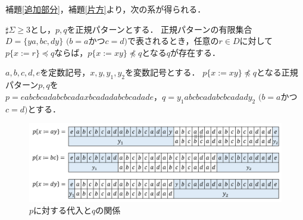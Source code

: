 補題\ref{追加部分}，補題\ref{片方}より，次の系が得られる．

\begin{col}\label{両方}
$\sharp \Sigma \ge 3$とし，$p, q$を正規パターンとする．
正規パターンの有限集合$D= \{ ya, bc, dy \}$ $(b = a$かつ$c = d)$で表されるとき，任意の$r \in D$に対して$p \{ x := r \} \preceq q$ならば，$p \{ x := xy \} \not \preceq q$となる$q$が存在する．
\end{col}
\begin{ex}
$a,b,c,d,e$を定数記号，$x,y,y_{1},y_{2}$を変数記号とする．
$p \{ x:=xy \} \not \preceq q$となる正規パターン$p,q$を$p=eabcbcadabcbcadaxbcadadabcbcadade，q=y_{1}abcbcadabcbcadady_{2}$ $(b = a$かつ$c = d)$とする．
\end{ex}

\begin{figure}
\includegraphics[width=\linewidth]{画像/b=aとc=dの例.png}
\vspace{-1cm}
\caption{$p$に対する代入と$q$の関係}
\label{b=aとc=dの例}
\end{figure}

